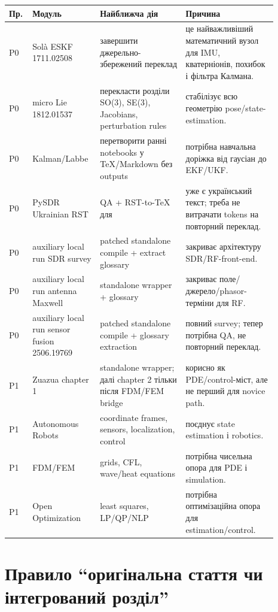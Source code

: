 \begin{longtable}{L{0.07\linewidth}L{0.20\linewidth}L{0.30\linewidth}L{0.32\linewidth}}
\toprule
\textbf{Пр.} & \textbf{Модуль} & \textbf{Найближча дія} & \textbf{Причина}\\
\midrule
P0 & Solà ESKF 1711.02508 & завершити джерельно-збережений переклад  & це найважливіший математичний вузол для IMU, кватерніонів, похибок і фільтра Калмана.\\
P0 & micro Lie 1812.01537 & перекласти розділи SO(3), SE(3), Jacobians, perturbation rules & стабілізує всю геометрію pose/state-estimation.\\
P0 & Kalman/Labbe & перетворити ранні notebooks у TeX/Markdown без outputs & потрібна навчальна доріжка від гаусіан до EKF/UKF.\\
P0 & PySDR Ukrainian RST & QA + RST-to-TeX для  & уже є український текст; треба не витрачати tokens на повторний переклад.\\
P0 & auxiliary local run SDR survey & patched standalone compile + extract glossary & закриває архітектуру SDR/RF-front-end.\\
P0 & auxiliary local run antenna Maxwell & standalone wrapper + glossary & закриває поле/джерело/phasor-терміни для RF.\\
P0 & auxiliary local run sensor fusion 2506.19769 & patched standalone compile + glossary extraction & повний survey; тепер потрібна QA, не повторний переклад.\\
P1 & Zuazua chapter 1 & standalone wrapper; далі chapter 2 тільки після FDM/FEM bridge & корисно як PDE/control-міст, але не перший для novice path.\\
P1 & Autonomous Robots & coordinate frames, sensors, localization, control & поєднує state estimation і robotics.\\
P1 & FDM/FEM & grids, CFL, wave/heat equations & потрібна чисельна опора для PDE і simulation.\\
P1 & Open Optimization & least squares, LP/QP/NLP & потрібна оптимізаційна опора для estimation/control.\\
\bottomrule
\end{longtable}

\section{Правило ``оригінальна стаття чи інтегрований розділ''}

